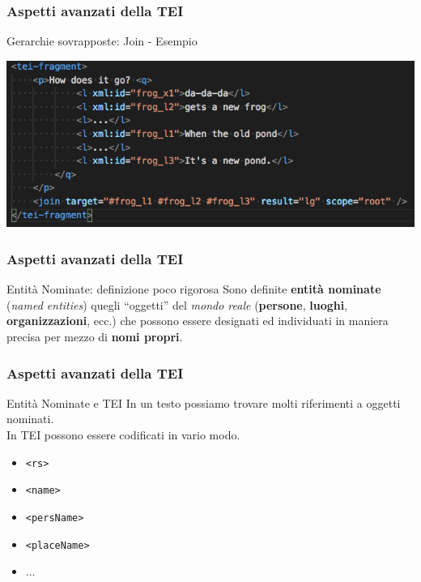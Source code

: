     \begin{frame}
        \frametitle{Aspetti avanzati della TEI}
        \addtocounter{nframe}{1}

        \begin{block}{Gerarchie sovrapposte: Join - Esempio}
            \begin{center}
                \includegraphics[width=.95\textwidth]{imgs/join.png}
            \end{center}
        \end{block}
    \end{frame}

    \begin{frame}
        \frametitle{Aspetti avanzati della TEI}
        \addtocounter{nframe}{1}

        \begin{block}{Entità Nominate: definizione poco rigorosa}
            Sono definite \textbf{entità nominate} (\textit{named entities}) quegli ``oggetti'' del \textit{mondo reale} (\textbf{persone}, \textbf{luoghi}, \textbf{organizzazioni}, ecc.) che possono essere designati ed individuati in maniera precisa per mezzo di \textbf{nomi propri}.
        \end{block}
    \end{frame}

    \begin{frame}
        \frametitle{Aspetti avanzati della TEI}
        \addtocounter{nframe}{1}

        \begin{block}{Entità Nominate e TEI}
            In un testo possiamo trovare molti riferimenti a oggetti nominati.
            \\In TEI possono essere codificati in vario modo.
        \end{block}
        
            \begin{itemize}
                \item \texttt{<rs>}
                \item \texttt{<name>}
                \item \texttt{<persName>}
                \item \texttt{<placeName>}
                \item ...
            \end{itemize}
        
    \end{frame}

